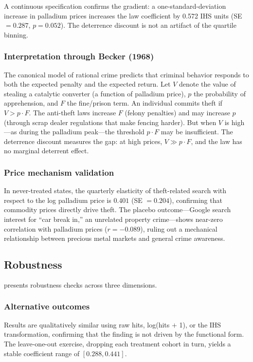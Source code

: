 \documentclass[12pt]{article}
\begin{document}
A continuous specification confirms the gradient: a one-standard-deviation increase in palladium prices increases the law coefficient by 0.572 IHS units (SE $= 0.287$, $p = 0.052$). The deterrence discount is not an artifact of the quartile binning.



\subsubsection*{Interpretation through Becker (1968)} The canonical model of rational crime \citep{becker1968crime} predicts that criminal behavior responds to both the expected penalty and the expected return. Let $V$ denote the value of stealing a catalytic converter (a function of palladium price), $p$ the probability of apprehension, and $F$ the fine/prison term. An individual commits theft if $V > p \cdot F$. The anti-theft laws increase $F$ (felony penalties) and may increase $p$ (through scrap dealer regulations that make fencing harder). But when $V$ is high---as during the palladium peak---the threshold $p \cdot F$ may be insufficient. The deterrence discount measures the gap: at high prices, $V \gg p \cdot F$, and the law has no marginal deterrent effect.

\subsubsection*{Price mechanism validation} In never-treated states, the quarterly elasticity of theft-related search with respect to the log palladium price is $0.401$ (SE $= 0.204$), confirming that commodity prices directly drive theft. The placebo outcome---Google search interest for ``car break in,'' an unrelated property crime---shows near-zero correlation with palladium prices ($r = -0.089$), ruling out a mechanical relationship between precious metal markets and general crime awareness.

\subsection{Robustness}

 presents robustness checks across three dimensions.

\subsubsection*{Alternative outcomes} Results are qualitatively similar using raw hits, log(hits $+$ 1), or the IHS transformation, confirming that the finding is not driven by the functional form. The leave-one-out exercise, dropping each treatment cohort in turn, yields a stable coefficient range of $[0.288, 0.441]$.
\end{document}

